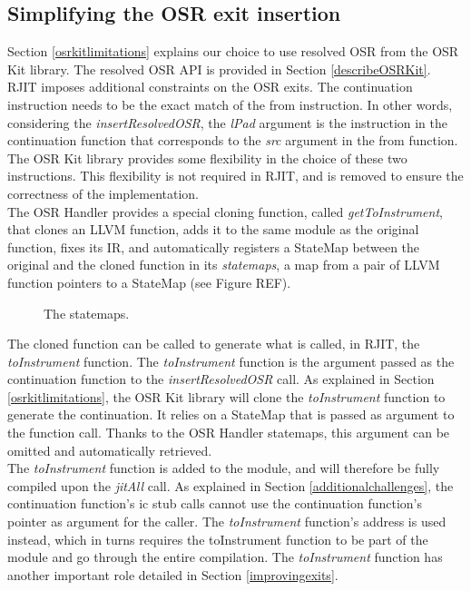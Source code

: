 \subsection{Simplifying the OSR exit insertion}

Section \ref{osrkitlimitations} explains our choice to use resolved OSR from the OSR Kit\cite{OSRKit} library.
The resolved OSR API is provided in Section \ref{describeOSRKit}.\\

RJIT imposes additional constraints on the OSR exits. 
The continuation instruction needs to be the exact match of the from instruction.
In other words, considering the \textit{insertResolvedOSR}, the \textit{lPad} argument is the instruction in the continuation function that corresponds to the \textit{src} argument in the from function.
The OSR Kit library provides some flexibility in the choice of these two instructions. 
This flexibility is not required in RJIT, and is removed to ensure the correctness of the implementation.\\

The OSR Handler provides a special cloning function, called \textit{getToInstrument}, that clones an LLVM function, adds it to the same module as the original function, fixes its IR, and automatically registers a StateMap between the original and the cloned function in its \textit{statemaps}, a map from a pair of LLVM function pointers to a StateMap (see Figure REF).\\

\begin{figure}[h]
\caption{The statemaps.}
\label{fig:statemaps}
\end{figure}

The cloned function can be called to generate what is called, in RJIT, the \textit{toInstrument} function.
The \textit{toInstrument} function is the argument passed as the continuation function to the \textit{insertResolvedOSR} call.
As explained in Section \ref{osrkitlimitations}, the OSR Kit library will clone the \textit{toInstrument} function to generate the continuation.
It relies on a StateMap that is passed as argument to the function call. 
Thanks to the OSR Handler statemaps, this argument can be omitted and automatically retrieved.\\

The \textit{toInstrument} function is added to the module, and will therefore be fully compiled upon the \textit{jitAll} call.
As explained in Section \ref{additionalchallenges}, the continuation function's ic stub calls cannot use the continuation function's pointer as argument for the caller. 
The \textit{toInstrument} function's address is used instead, which in turns requires the toInstrument function to be part of the module and go through the entire compilation.
The \textit{toInstrument} function has another important role detailed in Section \ref{improvingexits}.\\


